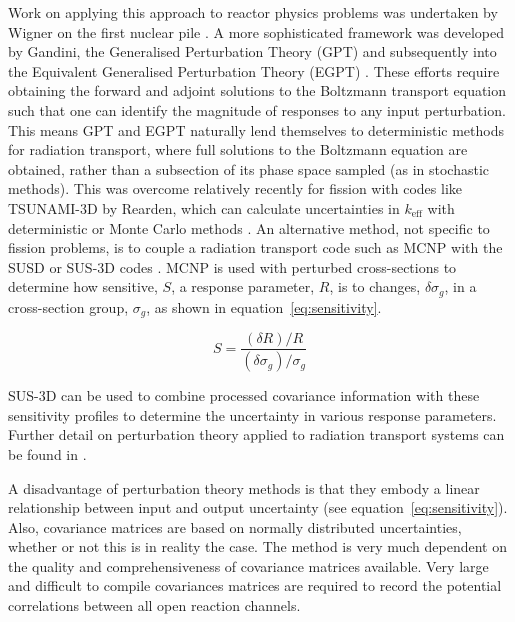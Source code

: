 Work on applying this approach to reactor physics problems was undertaken by Wigner on the first nuclear pile \cite{Rising2012}. A more sophisticated framework was developed by Gandini, the Generalised Perturbation Theory (GPT) \cite{Gandini1967} and subsequently into the Equivalent Generalised Perturbation Theory (EGPT) \cite{Gandini1986}. These efforts require obtaining the forward and adjoint solutions to the Boltzmann transport equation such that one can identify the magnitude of responses to any input perturbation. This means GPT and EGPT naturally lend themselves to deterministic methods for radiation transport, where full solutions to the Boltzmann equation are obtained, rather than a subsection of its phase space sampled (as in stochastic methods). This was overcome relatively recently for fission with codes like TSUNAMI-3D by Rearden, which can calculate uncertainties in $k_{\mathrm{eff}}$ with deterministic or Monte Carlo methods \cite{Rearden2004}. An alternative method, not specific to fission problems, is to couple a radiation transport code such as MCNP \cite{Goorley2012} with the SUSD or SUS-3D codes \cite{Kodeli2001}. MCNP is used with perturbed cross-sections to determine how sensitive, $S$, a response parameter, $R$, is to changes, $\delta \sigma_{g}$, in a cross-section group, $\sigma_{g}$, as shown in equation~\ref{eq:sensitivity}. 

\begin{equation}
  \label{eq:sensitivity}
  S = \frac{(\delta R)/R}{(\delta \sigma_{g}) / \sigma_{g}}
\end{equation}

SUS-3D can be used to combine processed covariance information with these sensitivity profiles to determine the uncertainty in various response parameters. Further detail on perturbation theory applied to radiation transport systems can be found in \cite{Sabouri2013}.

A disadvantage of perturbation theory methods is that they embody a linear relationship between input and output uncertainty (see equation~\ref{eq:sensitivity}). Also, covariance matrices are based on normally distributed uncertainties, whether or not this is in reality the case. The method is very much dependent on the quality and comprehensiveness of covariance matrices available. Very large and difficult to compile covariances matrices are required to record the potential correlations between all open reaction channels. 


